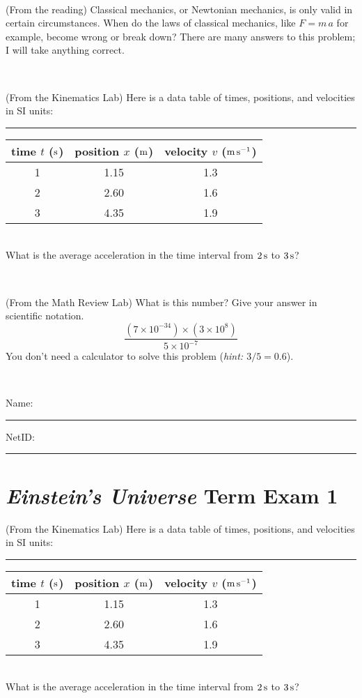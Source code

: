 \documentclass[12pt, letterpaper]{article}
\begin{document}
\vfill ~

\begin{problem} (From the reading)
Classical mechanics, or Newtonian mechanics, is only valid in certain
circumstances. When do the laws of classical mechanics, like $F =
m\,a$ for example, become wrong or break down? There are many answers
to this problem; I will take anything correct.
\end{problem}


\vfill ~

\begin{problem} (From the Kinematics Lab)
Here is a data table of times, positions, and velocities in SI units:\\
\rule{1.0in}{0pt}\begin{tabular}{c|c|c}
time $t$ ($\mathrm{s}$) & position $x$ ($\mathrm{m}$) & velocity $v$ ($\mathrm{m}\,\mathrm{s}^{-1}$) \\
\hline
1 & 1.15 & 1.3 \\
2 & 2.60 & 1.6 \\
3 & 4.35 & 1.9 \\
\hline
\end{tabular}\\
What is the average acceleration in the time interval from $2\,\mathrm{s}$ to $3\,\mathrm{s}$?
\end{problem}


\vfill ~

\begin{problem} (From the Math Review Lab)
What is this number? Give your answer in scientific notation.
$$
\frac{(7\times10^{-34})\times(3\times10^8)}{5\times10^{-7}}
$$
You don't need a calculator to solve this problem (\textit{hint: $3/5=0.6$}).
\end{problem}


\vfill ~


\cleardoublepage



\noindent
Name: \rule[-1ex]{0.60\textwidth}{0.1pt}
NetID: \rule[-1ex]{0.20\textwidth}{0.1pt}

\section*{\textsl{Einstein's Universe} Term Exam 1}
\setcounter{problem}{1}


\begin{problem} (From the Kinematics Lab)
Here is a data table of times, positions, and velocities in SI units:\\
\rule{1.0in}{0pt}\begin{tabular}{c|c|c}
time $t$ ($\mathrm{s}$) & position $x$ ($\mathrm{m}$) & velocity $v$ ($\mathrm{m}\,\mathrm{s}^{-1}$) \\
\hline
1 & 1.15 & 1.3 \\
2 & 2.60 & 1.6 \\
3 & 4.35 & 1.9 \\
\hline
\end{tabular}\\
What is the average acceleration in the time interval from $2\,\mathrm{s}$ to $3\,\mathrm{s}$?
\end{problem}
\end{document}
